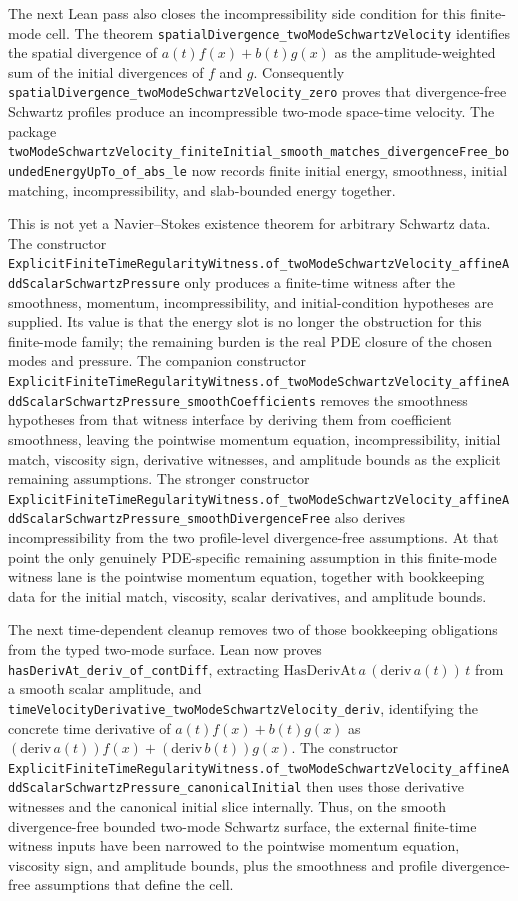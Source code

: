 \documentclass[11pt]{article}
\begin{document}
The next Lean pass also closes the incompressibility side condition for this
finite-mode cell.  The theorem
\texttt{spatialDivergence\_twoModeSchwartzVelocity} identifies the spatial
divergence of \(a(t)f(x)+b(t)g(x)\) as the amplitude-weighted sum of the
initial divergences of \(f\) and \(g\).  Consequently
\texttt{spatialDivergence\_twoModeSchwartzVelocity\_zero} proves that
divergence-free Schwartz profiles produce an incompressible two-mode
space-time velocity.  The package
\texttt{twoModeSchwartzVelocity\_finiteInitial\_smooth\_matches\_divergenceFree\_boundedEnergyUpTo\_of\_abs\_le}
now records finite initial energy, smoothness, initial matching,
incompressibility, and slab-bounded energy together.

This is not yet a Navier--Stokes existence theorem for arbitrary Schwartz
data.  The constructor
\texttt{ExplicitFiniteTimeRegularityWitness.of\_twoModeSchwartzVelocity\_affineAddScalarSchwartzPressure}
only produces a finite-time witness after the smoothness, momentum,
incompressibility, and initial-condition hypotheses are supplied.  Its value is
that the energy slot is no longer the obstruction for this finite-mode family;
the remaining burden is the real PDE closure of the chosen modes and pressure.
The companion constructor
\texttt{ExplicitFiniteTimeRegularityWitness.of\_twoModeSchwartzVelocity\_affineAddScalarSchwartzPressure\_smoothCoefficients}
removes the smoothness hypotheses from that witness interface by deriving them
from coefficient smoothness, leaving the pointwise momentum equation,
incompressibility, initial match, viscosity sign, derivative witnesses, and
amplitude bounds as the explicit remaining assumptions.
The stronger constructor
\texttt{ExplicitFiniteTimeRegularityWitness.of\_twoModeSchwartzVelocity\_affineAddScalarSchwartzPressure\_smoothDivergenceFree}
also derives incompressibility from the two profile-level divergence-free
assumptions.  At that point the only genuinely PDE-specific remaining
assumption in this finite-mode witness lane is the pointwise momentum equation,
together with bookkeeping data for the initial match, viscosity, scalar
derivatives, and amplitude bounds.

The next time-dependent cleanup removes two of those bookkeeping obligations
from the typed two-mode surface.  Lean now proves
\texttt{hasDerivAt\_deriv\_of\_contDiff}, extracting
\(\mathrm{HasDerivAt}\,a\,(\mathrm{deriv}\,a(t))\,t\) from a smooth scalar
amplitude, and
\texttt{timeVelocityDerivative\_twoModeSchwartzVelocity\_deriv}, identifying
the concrete time derivative of \(a(t)f(x)+b(t)g(x)\) as
\((\mathrm{deriv}\,a(t)) f(x)+(\mathrm{deriv}\,b(t))g(x)\).  The constructor
\texttt{ExplicitFiniteTimeRegularityWitness.of\_twoModeSchwartzVelocity\_affineAddScalarSchwartzPressure\_canonicalInitial}
then uses those derivative witnesses and the canonical initial slice
internally.  Thus, on the smooth divergence-free bounded two-mode Schwartz
surface, the external finite-time witness inputs have been narrowed to the
pointwise momentum equation, viscosity sign, and amplitude bounds, plus the
smoothness and profile divergence-free assumptions that define the cell.
\end{document}

